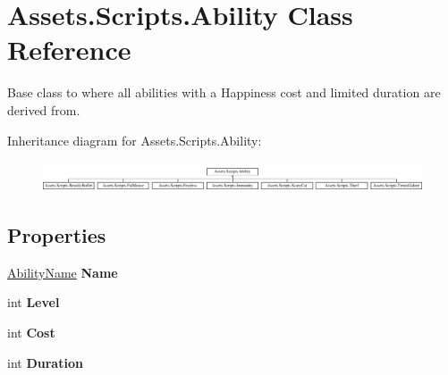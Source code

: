 \hypertarget{class_assets_1_1_scripts_1_1_ability}{}\section{Assets.\+Scripts.\+Ability Class Reference}
\label{class_assets_1_1_scripts_1_1_ability}


Base class to where all abilities with a Happiness cost and limited duration are derived from.  


Inheritance diagram for Assets.\+Scripts.\+Ability\+:\begin{figure}[H]
\begin{center}
\leavevmode
\includegraphics[height=0.898876cm]{class_assets_1_1_scripts_1_1_ability}
\end{center}
\end{figure}
\subsection*{Properties}
\begin{DoxyCompactItemize}
\item 
\hyperlink{namespace_assets_1_1_scripts_a105d4b16638bf60ee8e9f13a120d805b}{Ability\+Name} {\bfseries Name}\hypertarget{class_assets_1_1_scripts_1_1_ability_a4ff9114cf8cd0cae7e4fca9c200df9ca}{}\label{class_assets_1_1_scripts_1_1_ability_a4ff9114cf8cd0cae7e4fca9c200df9ca}

\item 
int {\bfseries Level}\hypertarget{class_assets_1_1_scripts_1_1_ability_a669af32fda5a346a0d4278d7eca5c77b}{}\label{class_assets_1_1_scripts_1_1_ability_a669af32fda5a346a0d4278d7eca5c77b}

\item 
int {\bfseries Cost}\hypertarget{class_assets_1_1_scripts_1_1_ability_a27dad2434386c58cbb9b1f7911438a2e}{}\label{class_assets_1_1_scripts_1_1_ability_a27dad2434386c58cbb9b1f7911438a2e}

\item 
int {\bfseries Duration}\hypertarget{class_assets_1_1_scripts_1_1_ability_a549776cf35bc2c65ed7b22ca634a3445}{}\label{class_assets_1_1_scripts_1_1_ability_a549776cf35bc2c65ed7b22ca634a3445}

\end{DoxyCompactItemize}


